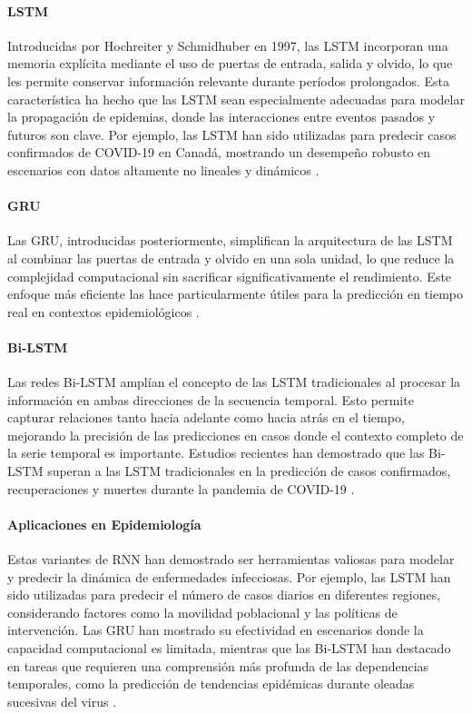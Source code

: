 \paragraph{LSTM}
Introducidas por Hochreiter y Schmidhuber en 1997, las LSTM incorporan una memoria explícita mediante el uso de puertas de entrada, salida y olvido, lo que les permite conservar información relevante durante períodos prolongados. Esta característica ha hecho que las LSTM sean especialmente adecuadas para modelar la propagación de epidemias, donde las interacciones entre eventos pasados y futuros son clave. Por ejemplo, las LSTM han sido utilizadas para predecir casos confirmados de COVID-19 en Canadá, mostrando un desempeño robusto en escenarios con datos altamente no lineales y dinámicos \cite{Nguyen2023, Baccega2024}.

\paragraph{GRU}
Las GRU, introducidas posteriormente, simplifican la arquitectura de las LSTM al combinar las puertas de entrada y olvido en una sola unidad, lo que reduce la complejidad computacional sin sacrificar significativamente el rendimiento. Este enfoque más eficiente las hace particularmente útiles para la predicción en tiempo real en contextos epidemiológicos \cite{Santangelo2023}.

\paragraph{Bi-LSTM}
Las redes Bi-LSTM amplían el concepto de las LSTM tradicionales al procesar la información en ambas direcciones de la secuencia temporal. Esto permite capturar relaciones tanto hacia adelante como hacia atrás en el tiempo, mejorando la precisión de las predicciones en casos donde el contexto completo de la serie temporal es importante. Estudios recientes han demostrado que las Bi-LSTM superan a las LSTM tradicionales en la predicción de casos confirmados, recuperaciones y muertes durante la pandemia de COVID-19 \cite{Baccega2024}.

\paragraph{Aplicaciones en Epidemiología}
Estas variantes de RNN han demostrado ser herramientas valiosas para modelar y predecir la dinámica de enfermedades infecciosas. Por ejemplo, las LSTM han sido utilizadas para predecir el número de casos diarios en diferentes regiones, considerando factores como la movilidad poblacional y las políticas de intervención. Las GRU han mostrado su efectividad en escenarios donde la capacidad computacional es limitada, mientras que las Bi-LSTM han destacado en tareas que requieren una comprensión más profunda de las dependencias temporales, como la predicción de tendencias epidémicas durante oleadas sucesivas del virus \cite{Nguyen2023, Baccega2024}.

